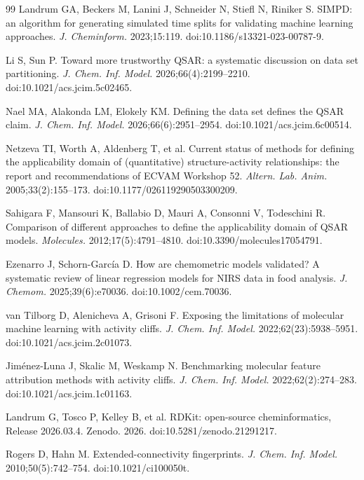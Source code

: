 \begin{thebibliography}{99}
Landrum GA, Beckers M, Lanini J, Schneider N, Stiefl N, Riniker S. SIMPD: an algorithm for generating simulated time splits for validating machine learning approaches. \textit{J. Cheminform.} 2023;15:119. doi:10.1186/s13321-023-00787-9.

Li S, Sun P. Toward more trustworthy QSAR: a systematic discussion on data set partitioning. \textit{J. Chem. Inf. Model.} 2026;66(4):2199--2210. doi:10.1021/acs.jcim.5c02465.

Nael MA, Alakonda LM, Elokely KM. Defining the data set defines the QSAR claim. \textit{J. Chem. Inf. Model.} 2026;66(6):2951--2954. doi:10.1021/acs.jcim.6c00514.

Netzeva TI, Worth A, Aldenberg T, et al. Current status of methods for defining the applicability domain of (quantitative) structure-activity relationships: the report and recommendations of ECVAM Workshop 52. \textit{Altern. Lab. Anim.} 2005;33(2):155--173. doi:10.1177/026119290503300209.

Sahigara F, Mansouri K, Ballabio D, Mauri A, Consonni V, Todeschini R. Comparison of different approaches to define the applicability domain of QSAR models. \textit{Molecules.} 2012;17(5):4791--4810. doi:10.3390/molecules17054791.

Ezenarro J, Schorn-Garc\'{i}a D. How are chemometric models validated? A systematic review of linear regression models for NIRS data in food analysis. \textit{J. Chemom.} 2025;39(6):e70036. doi:10.1002/cem.70036.

van Tilborg D, Alenicheva A, Grisoni F. Exposing the limitations of molecular machine learning with activity cliffs. \textit{J. Chem. Inf. Model.} 2022;62(23):5938--5951. doi:10.1021/acs.jcim.2c01073.

Jim\'{e}nez-Luna J, Skalic M, Weskamp N. Benchmarking molecular feature attribution methods with activity cliffs. \textit{J. Chem. Inf. Model.} 2022;62(2):274--283. doi:10.1021/acs.jcim.1c01163.

Landrum G, Tosco P, Kelley B, et al. RDKit: open-source cheminformatics, Release 2026.03.4. Zenodo. 2026. doi:10.5281/zenodo.21291217.

Rogers D, Hahn M. Extended-connectivity fingerprints. \textit{J. Chem. Inf. Model.} 2010;50(5):742--754. doi:10.1021/ci100050t.


\end{thebibliography}
